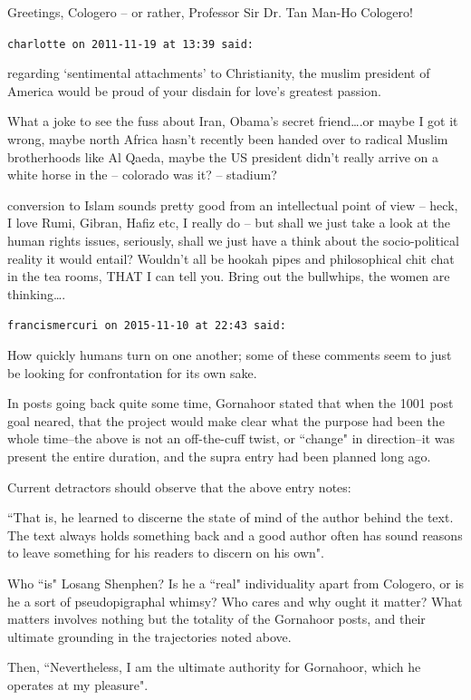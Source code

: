 \begin{footnotesize}
\begin{sffamily}
Greetings, Cologero – or rather, Professor Sir Dr. Tan Man-Ho Cologero!


\hfill

\texttt{charlotte on 2011-11-19 at 13:39 said: }

regarding `sentimental attachments' to Christianity, the muslim president of America would be proud of your disdain for love's greatest passion.

What a joke to see the fuss about Iran, Obama's secret friend….or maybe I got it wrong, maybe north Africa hasn't recently been handed over to radical Muslim brotherhoods like Al Qaeda, maybe the US president didn't really arrive on a white horse in the – colorado was it? – stadium?

conversion to Islam sounds pretty good from an intellectual point of view – heck, I love Rumi, Gibran, Hafiz etc, I really do – but shall we just take a look at the human rights issues, seriously, shall we just have a think about the socio-political reality it would entail? Wouldn't all be hookah pipes and philosophical chit chat in the tea rooms, THAT I can tell you. Bring out the bullwhips, the women are thinking….


\hfill

\texttt{francismercuri on 2015-11-10 at 22:43 said: }

How quickly humans turn on one another; some of these comments seem to just be looking for confrontation for its own sake.

In posts going back quite some time, Gornahoor stated that when the 1001 post goal neared, that the project would make clear what the purpose had been the whole time–the above is not an off-the-cuff twist, or ``change" in direction–it was present the entire duration, and the supra entry had been planned long ago.

Current detractors should observe that the above entry notes:

``That is, he learned to discerne the state of mind of the author behind the text. The text always holds something back and a good author often has sound reasons to leave something for his readers to discern on his own". 

Who ``is" Losang Shenphen? Is he a ``real" individuality apart from Cologero, or is he a sort of pseudopigraphal whimsy? Who cares and why ought it matter? What matters involves nothing but the totality of the Gornahoor posts, and their ultimate grounding in the trajectories noted above.

Then, ``Nevertheless, I am the ultimate authority for Gornahoor, which he operates at my pleasure".


\end{sffamily}
\end{footnotesize}
